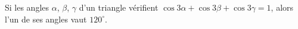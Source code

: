 Si les angles $\alpha$, $\beta$, $\gamma$ d'un triangle vérifient $\cos 3\alpha + \cos 3\beta + \cos 3\gamma = 1$, alors l'un de ses angles vaut $120^\circ$.

